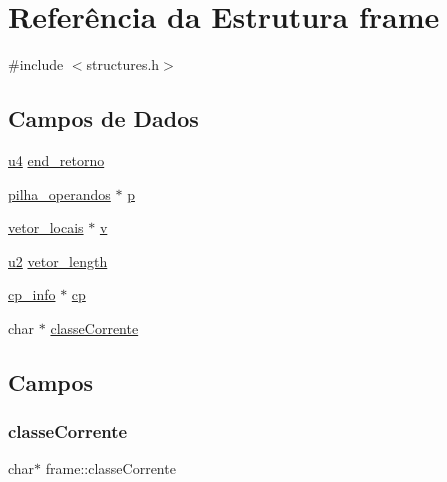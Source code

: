 \hypertarget{structframe}{}\section{Referência da Estrutura frame}
\label{structframe}


{\ttfamily \#include $<$structures.\+h$>$}

\subsection*{Campos de Dados}
\begin{DoxyCompactItemize}
\item 
\hyperlink{lista__operandos_8h_ae5be1f726785414dd1b77d60df074c9d}{u4} \hyperlink{structframe_a5d2f3ff696847f4147ff799395a331fc}{end\+\_\+retorno}
\item 
\hyperlink{structpilha__operandos}{pilha\+\_\+operandos} $\ast$ \hyperlink{structframe_a6aa3e7c39989aa1477fd946643f521fe}{p}
\item 
\hyperlink{structvetor__locais}{vetor\+\_\+locais} $\ast$ \hyperlink{structframe_a01ae11b1517de21c420c3c9a6a267401}{v}
\item 
\hyperlink{lista__operandos_8h_a732cde1300aafb73b0ea6c2558a7a54f}{u2} \hyperlink{structframe_aec98a2c044409e921f45ac926ace588e}{vetor\+\_\+length}
\item 
\hyperlink{structcp__info}{cp\+\_\+info} $\ast$ \hyperlink{structframe_a93acb5bd67bf7dbfd2605c2d5c4c76c5}{cp}
\item 
char $\ast$ \hyperlink{structframe_a9c7ccb24c4cc2e9c8e17f1f5e9809211}{classe\+Corrente}
\end{DoxyCompactItemize}


\subsection{Campos}
\mbox{\label{structframe_a9c7ccb24c4cc2e9c8e17f1f5e9809211}} 
\subsubsection{\texorpdfstring{classe\+Corrente}{classeCorrente}}
{\footnotesize\ttfamily char$\ast$ frame\+::classe\+Corrente}

\mbox{\label{structframe_a93acb5bd67bf7dbfd2605c2d5c4c76c5}} 
